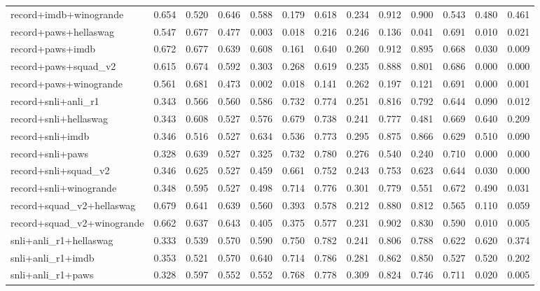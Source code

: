\begin{table}[t]
\begin{tabular}{lrrrrrrrrrrrr}
    record+imdb+winogrande & 0.654 & 0.520 & 0.646 & 0.588 & 0.179 & 0.618 & 0.234 & 0.912 & 0.900 & 0.543 & 0.480 & 0.461 \\
    record+paws+hellaswag & 0.547 & 0.677 & 0.477 & 0.003 & 0.018 & 0.216 & 0.246 & 0.136 & 0.041 & 0.691 & 0.010 & 0.021 \\
    record+paws+imdb & 0.672 & 0.677 & 0.639 & 0.608 & 0.161 & 0.640 & 0.260 & 0.912 & 0.895 & 0.668 & 0.030 & 0.009 \\
    record+paws+squad\_v2 & 0.615 & 0.674 & 0.592 & 0.303 & 0.268 & 0.619 & 0.235 & 0.888 & 0.801 & 0.686 & 0.000 & 0.000 \\
    record+paws+winogrande & 0.561 & 0.681 & 0.473 & 0.002 & 0.018 & 0.141 & 0.262 & 0.197 & 0.121 & 0.691 & 0.000 & 0.001 \\
    record+snli+anli\_r1 & 0.343 & 0.566 & 0.560 & 0.586 & 0.732 & 0.774 & 0.251 & 0.816 & 0.792 & 0.644 & 0.090 & 0.012 \\
    record+snli+hellaswag & 0.343 & 0.608 & 0.527 & 0.576 & 0.679 & 0.738 & 0.241 & 0.777 & 0.481 & 0.669 & 0.640 & 0.209 \\
    record+snli+imdb & 0.346 & 0.516 & 0.527 & 0.634 & 0.536 & 0.773 & 0.295 & 0.875 & 0.866 & 0.629 & 0.510 & 0.090 \\
    record+snli+paws & 0.328 & 0.639 & 0.527 & 0.325 & 0.732 & 0.780 & 0.276 & 0.540 & 0.240 & 0.710 & 0.000 & 0.000 \\
    record+snli+squad\_v2 & 0.346 & 0.625 & 0.527 & 0.459 & 0.661 & 0.752 & 0.243 & 0.753 & 0.623 & 0.644 & 0.030 & 0.000 \\
    record+snli+winogrande & 0.348 & 0.595 & 0.527 & 0.498 & 0.714 & 0.776 & 0.301 & 0.779 & 0.551 & 0.672 & 0.490 & 0.031 \\
    record+squad\_v2+hellaswag & 0.679 & 0.641 & 0.639 & 0.560 & 0.393 & 0.578 & 0.212 & 0.880 & 0.812 & 0.565 & 0.110 & 0.059 \\
    record+squad\_v2+winogrande & 0.662 & 0.637 & 0.643 & 0.405 & 0.375 & 0.577 & 0.231 & 0.902 & 0.830 & 0.590 & 0.010 & 0.005 \\
    snli+anli\_r1+hellaswag & 0.333 & 0.539 & 0.570 & 0.590 & 0.750 & 0.782 & 0.241 & 0.806 & 0.788 & 0.622 & 0.620 & 0.374 \\
    snli+anli\_r1+imdb & 0.353 & 0.521 & 0.570 & 0.640 & 0.714 & 0.786 & 0.281 & 0.862 & 0.850 & 0.527 & 0.520 & 0.202 \\
    snli+anli\_r1+paws & 0.328 & 0.597 & 0.552 & 0.552 & 0.768 & 0.778 & 0.309 & 0.824 & 0.746 & 0.711 & 0.020 & 0.005 \\

\end{tabular}
\end{table}
